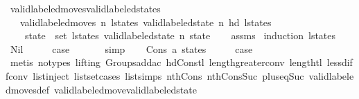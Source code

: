 \begin{isabellebody}
\isanewline
{}\isamarkupfalse%
\ valid{\isacharunderscore}labeled{\isacharunderscore}moves{\isacharunderscore}valid{\isacharunderscore}labeled{\isacharunderscore}states{\isacharcolon}\isanewline
\ \ \ {\isachardoublequoteopen}valid{\isacharunderscore}labeled{\isacharunderscore}moves\ n\ l{\isacharunderscore}states{\isachardoublequoteclose}\ {\isachardoublequoteopen}valid{\isacharunderscore}labeled{\isacharunderscore}state\ n\ {\isacharparenleft}hd\ l{\isacharunderscore}states{\isacharparenright}{\isachardoublequoteclose}\isanewline
\ \ \ {\isachardoublequoteopen}{\isasymforall}\ state\ {\isasymin}\ set\ l{\isacharunderscore}states{\isachardot}\ valid{\isacharunderscore}labeled{\isacharunderscore}state\ n\ state{\isachardoublequoteclose}\isanewline
%
\isadelimproof
\ \ %
\endisadelimproof
%
\isatagproof
{}\isamarkupfalse%
\ assms\isanewline
{}\isamarkupfalse%
\ {\isacharparenleft}induction\ l{\isacharunderscore}states{\isacharparenright}\isanewline
\ \ \isamarkupfalse%
\ Nil\isanewline
\ \ \isamarkupfalse%
\ \isamarkupfalse%
\ {\isacharquery}case\ \isanewline
\ \ \ \ \isamarkupfalse%
\ simp\isanewline
{}\isamarkupfalse%
\isanewline
\ \ \isamarkupfalse%
\ {\isacharparenleft}Cons\ a\ states{\isacharparenright}\isanewline
\ \ \isamarkupfalse%
\ \isamarkupfalse%
\ {\isacharquery}case\isanewline
\ \ \ \ \isamarkupfalse%
\ {\isacharparenleft}metis\ {\isacharparenleft}no{\isacharunderscore}types{\isacharcomma}\ lifting{\isacharparenright}\ Groups{\isachardot}add{\isacharunderscore}ac{\isacharparenleft}{}{\isacharparenright}\ hd{\isacharunderscore}Cons{\isacharunderscore}tl\ length{\isacharunderscore}greater{\isacharunderscore}{}{\isacharunderscore}conv\ length{\isacharunderscore}tl\ less{\isacharunderscore}diff{\isacharunderscore}conv\ list{\isachardot}inject\ list{\isachardot}set{\isacharunderscore}cases\ list{\isachardot}simps{\isacharparenleft}{}{\isacharparenright}\ nth{\isacharunderscore}Cons{\isacharunderscore}{}\ nth{\isacharunderscore}Cons{\isacharunderscore}Suc\ plus{\isacharunderscore}{}{\isacharunderscore}eq{\isacharunderscore}Suc\ valid{\isacharunderscore}labeled{\isacharunderscore}moves{\isacharunderscore}def\ valid{\isacharunderscore}labeled{\isacharunderscore}move{\isacharunderscore}valid{\isacharunderscore}labeled{\isacharunderscore}state{\isacharparenright}\isanewline

\end{isabellebody}
